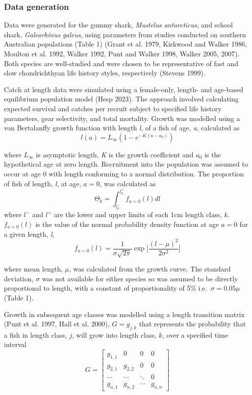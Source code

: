 \documentclass[
]{article}
\begin{document}
\subsubsection{Data generation}\label{data-generation}

Data were generated for the gummy shark, \emph{Mustelus antarcticus}, and school shark, \emph{Galeorhinus galeus}, using parameters from studies conducted on southern Australian populations (Table 1) (Grant et al. 1979, Kirkwood and Walker 1986, Moulton et al. 1992, Walker 1992, Punt and Walker 1998, Walker 2005, 2007). Both species are well-studied and were chosen to be representative of fast and slow chondrichthyan life history styles, respectively (Stevens 1999).

Catch at length data were simulated using a female-only, length- and age-based equilibrium population model (Hesp 2023). The approach involved calculating expected survival and catches per recruit subject to specified life history parameters, gear selectivity, and total mortality. Growth was modelled using a von Bertalanffy growth function with length \emph{l}, of a fish of age, \emph{a}, calculated as \[l(a) = L_\infty (1- e^{-K(a-a_0)})\]

where \(L_\infty\) is asymptotic length, \emph{K} is the growth coefficient and \(a_0\) is the hypothetical age at zero length. Recruitment into the population was assumed to occur at age 0 with length conforming to a normal distribution. The proportion of fish of length, \emph{l}, at age, \(a = 0\), was calculated as \[\Theta_k = \int_{l^-_k}^{l^+_k}f_{a=0}(l)dl\] where \(l^-\) and \(l^+\) are the lower and upper limits of each 1cm length class, \emph{k}. \(f_{a=0}(l)\) is the value of the normal probability density function at age \(a = 0\) for a given length, \emph{l},\[f_{a=0}(l) = \frac{1}{\sigma\sqrt{2{\pi}}}\exp\bigg[\frac{(l-\mu)^2}{2\sigma^2}\bigg]
\]

where mean length, \(\mu\), was calculated from the growth curve. The standard deviation, \(\sigma\) was not available for either species so was assumed to be directly proportional to length, with a constant of proportionality of 5\% i.e.~\(\sigma = 0.05 \mu\) (Table 1).

Growth in subsequent age classes was modelled using a length transition matrix (Punt et al. 1997, Hall et al. 2000), \(G = g_{j,k}\) that represents the probability that a fish in length class, \(j\), will grow into length class, \(k\), over a specified time interval \[ G = \begin{bmatrix}
 g_{1,1}&0& 0 &0\\ 
 g_{2,1}& g_{2,2} & 0  &0 \\ 
 \cdots&\cdots  & \ddots  & 0\\ 
 g_{n,1}& g_{n,2} & \cdots & g_{n,n}
\end{bmatrix}\]
\end{document}
